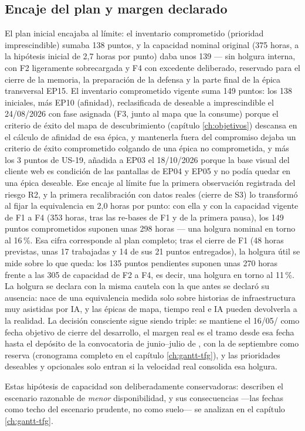 \subsection{Encaje del plan y margen declarado}
\label{sec:fases-tension}

El plan inicial encajaba al límite: el inventario comprometido (prioridad imprescindible) sumaba 138 puntos, y la capacidad nominal original (375 horas, a la hipótesis inicial de 2,7 horas por punto) daba unos 139 — sin holgura interna, con F2 ligeramente sobrecargada y F4 con excedente deliberado, reservado para el cierre de la memoria, la preparación de la defensa y la parte final de la épica transversal EP15.
El inventario comprometido vigente suma 149 puntos: los 138 iniciales, más EP10 (afinidad), reclasificada de deseable a imprescindible el 24/08/2026 con fase asignada (F3, junto al mapa que la consume) porque el criterio de éxito del mapa de descubrimiento (capítulo \ref{ch:objetivos}) descansa en el cálculo de afinidad de esa épica, y mantenerla fuera del compromiso dejaba un criterio de éxito comprometido colgando de una épica no comprometida, y más los 3 puntos de US-19, añadida a EP03 el 18/10/2026 porque la base visual del cliente web es condición de las pantallas de EP04 y EP05 y no podía quedar en una épica deseable.
Ese encaje al límite fue la primera observación registrada del riesgo R2, y la primera recalibración con datos reales (cierre de S3) lo transformó al fijar la equivalencia en 2,0 horas por punto: con ella y con la capacidad vigente de F1 a F4 (353 horas, tras las re-bases de F1 y de la primera pausa), los 149 puntos comprometidos suponen unas 298 horas — una holgura nominal en torno al 16\,\%.
Esa cifra corresponde al plan completo; tras el cierre de F1 (48 horas previstas, unas 17 trabajadas y 14 de sus 21 puntos entregados), la holgura útil se mide sobre lo que queda: los 135 puntos pendientes suponen unas 270 horas frente a las 305 de capacidad de F2 a F4, es decir, una holgura en torno al 11\,\%.
La holgura se declara con la misma cautela con la que antes se declaró su ausencia: nace de una equivalencia medida solo sobre historias de infraestructura muy asistidas por \ac{IA}, y las épicas de mapa, tiempo real e \ac{IA} pueden devolverla a la realidad.
La decisión consciente sigue siendo triple: se mantiene el 16/05/\thesisYear{} como fecha objetivo de cierre del desarrollo, el margen real es el tramo desde esa fecha hasta el depósito de la convocatoria de junio--julio de \thesisYear, con la de septiembre como reserva (cronograma completo en el capítulo \ref{ch:gantt-tfg}), y las prioridades deseables y opcionales solo entran si la velocidad real consolida esa holgura.

Estas hipótesis de capacidad son deliberadamente conservadoras: describen el escenario razonable de \emph{menor} disponibilidad, y sus consecuencias —las fechas como techo del escenario prudente, no como suelo— se analizan en el capítulo \ref{ch:gantt-tfg}.
